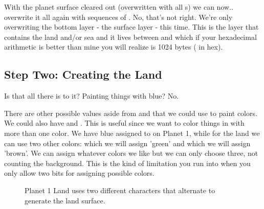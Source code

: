 %


With the planet surface cleared out (overwritten with all s) we can now.. overwrite it all again with sequences of
. No, that's not right. We're only overwriting the bottom layer - the surface layer - this time. This is the
layer that contains the land and/or sea and it lives between  and  which if your hexadecimal
arithmetic is better than mine you will realize is 1024 bytes ( in hex).

%




\subsection{Step Two: Creating the Land}

Is that all there is to it? Painting things with blue? No. 

There are other possible values aside from  and  that we
could use to paint colors. We could also have  and . This
is useful since we want to color things in with more than one color. We have
blue assigned to  on Planet 1, while for the land we can use two
other colors:  which we will assign 'green' and  which we
will assign 'brown'. We can assign whatever colors we like but we can only
choose three, not counting the background. This is the kind of limitation you
run into when you only allow two bits for assigning possible colors.

\begin{figure}[H]
{
  \setlength{\tabcolsep}{3.0pt}
  \setlength\cmidrulewidth{\heavyrulewidth} %
    \begin{adjustbox}{width=10cm,center}
  \begin{subfigure}{0.3\textwidth}
  
  \end{subfigure}
  \begin{subfigure}{0.3\textwidth}
  
  \end{subfigure}
  \end{adjustbox}
}\caption[]{Planet 1 Land uses two different characters that alternate to generate the land surface.}
\end{figure}


